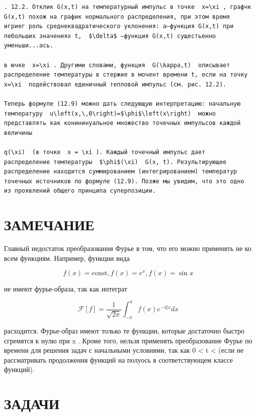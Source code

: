 \documentclass[
  ukrainian,
]{article}
\begin{document}
\begin{verbatim}
. 12.2. Отклик G(x,t) на температурный импульс в точке  x=\xi , графчк G(x,t) похож на график нормального распределения, при этом время игриег роль среднеквадратического уклонения: a—функция G(x,t) при пебольших значениях t,  $\delta$ —функция G(x,t) сущестьенно уменьши...ась.

в ючке  x=\xi . Другими словами, функция  G(\kappa,t)  описывает распределение температуры в стержие в мочент времени t, если на точку  x=\xi  подействовал единичный тепловой импульс (см. рис. 12.2).

Теперь формуле (12.9) можно дать следующую интерпретацию: начальную температуру  u\left(x,\,0\right)=$\phi$\left(x\right)  можно представлять как конининуальное множество точечных импульсов каждой величины

q(\xi)  (в точке  x = \xi ). Каждый точечный импульс дает распределение температуры  $\phi$(\xi)  G(x, t). Результирующее распределение находится суммированием (интегрированием) температур точечных источников по формуле (12.9). Позже мы увидим, что это одно из проявлений общего принципа суперпозиции.
\end{verbatim}

\section{ЗАМЕЧАНИЕ}\label{ux437ux430ux43cux435ux447ux430ux43dux438ux435}

Главный недостаток преобразования Фурье в том, что его можно применять
не ко всем функциям. Например, функции вида

\[
f(x) = \text{const},
f(x) = e^x,
f(x) = \sin x
\]

не имеют фурье-образа, так как интеграт

\[
\mathcal{F}[f] = \frac{1}{\sqrt{2\pi}} \int_{-\pi}^{\pi} f(x) e^{-i\xi x} dx
\]

расходится. Фурье-образ имеют только те функции, которые достаточно
быстро сгремятся к нулю при \textbar x\textbar{} \to \infty . Кроме
того, нельзя применять преобразование Фурье по времени для решения задач
с начальными условиями, так как 0 \textless{} t \textless{}
\infty  (если не рассматривать продолжения функций на полуось в
соответствующем классе функций).

\section{ЗАДАЧИ}\label{ux437ux430ux434ux430ux447ux438-1}
\end{document}
